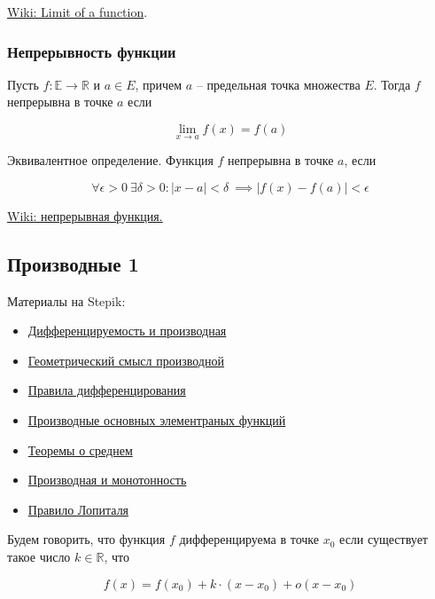 \documentclass{article}
\begin{document}
\href{https://en.wikipedia.org/wiki/Limit_of_a_function}{Wiki: Limit of a function}.

\subsubsection{Непрерывность функции}

Пусть $f : \mathbb{E} \to \mathbb{R}$ и $a \in E$, причем $a$ -- предельная точка множества $E$. Тогда $f$ непрерывна в точке $a$ если

$$ \lim\limits_{x \to a} f(x) = f(a) $$ 

Эквивалентное определение. Функция $f$ непрерывна в точке $a$, если

$$ \forall \epsilon > 0 \ \exists \delta > 0 : |x - a| < \delta \ \implies |f(x) - f(a)| < \epsilon $$

\href{https://ru.wikipedia.org/wiki/%D0%9D%D0%B5%D0%BF%D1%80%D0%B5%D1%80%D1%8B%D0%B2%D0%BD%D0%B0%D1%8F_%D1%84%D1%83%D0%BD%D0%BA%D1%86%D0%B8%D1%8F}{Wiki: непрерывная функция.}

\subsection{Производные 1}

Материалы на Stepik:

\begin{itemize}
	\item \href{https://stepik.org/lesson/28380/step/1}{Дифференцируемость и производная}
	\item \href{https://stepik.org/lesson/28380/step/4}{Геометрический смысл производной}
	\item \href{https://stepik.org/lesson/28380/step/6}{Правила дифференцирования}
	\item \href{https://stepik.org/lesson/28380/step/8}{Производные основных элементраных функций}
	\item \href{https://stepik.org/lesson/28369/step/2}{Теоремы о среднем}
	\item \href{https://stepik.org/lesson/28370/step/1}{Производная и монотонность}
	\item \href{https://stepik.org/lesson/28381/step/1}{Правило Лопиталя}
\end{itemize}

Будем говорить, что функция $f$ дифференцируема в точке $x_0$ если существует такое число $k \in \mathbb{R}$, что

$$ f(x) = f(x_0) + k \cdot (x - x_0) + o(x - x_0) $$
\end{document}
